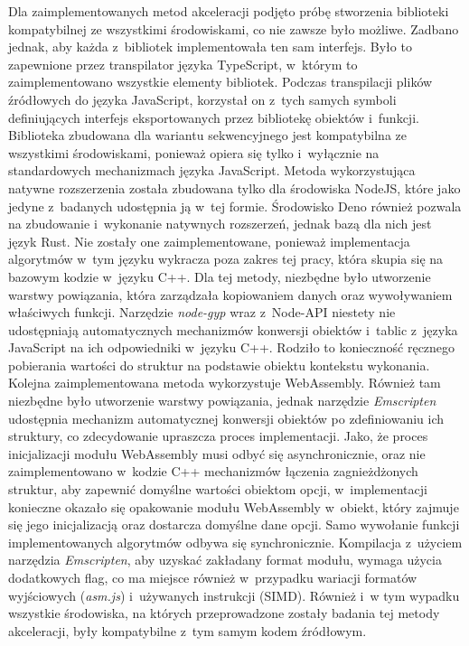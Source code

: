 Dla zaimplementowanych metod akceleracji podjęto próbę stworzenia biblioteki kompatybilnej ze wszystkimi środowiskami, co nie zawsze było możliwe. Zadbano jednak, aby każda z~bibliotek implementowała ten sam interfejs. Było to zapewnione przez transpilator języka TypeScript, w~którym to zaimplementowano wszystkie elementy bibliotek. Podczas transpilacji plików źródłowych do języka JavaScript, korzystał on z~tych samych symboli definiujących interfejs eksportowanych przez bibliotekę obiektów i~funkcji. Biblioteka zbudowana dla wariantu sekwencyjnego jest kompatybilna ze wszystkimi środowiskami, ponieważ opiera się tylko i~wyłącznie na standardowych mechanizmach języka JavaScript. Metoda wykorzystująca natywne rozszerzenia została zbudowana tylko dla środowiska NodeJS, które jako jedyne z~badanych udostępnia ją w~tej formie. Środowisko Deno również pozwala na zbudowanie i~wykonanie natywnych rozszerzeń, jednak bazą dla nich jest język Rust. Nie zostały one zaimplementowane, ponieważ implementacja algorytmów w~tym języku wykracza poza zakres tej pracy, która skupia się na bazowym kodzie w~języku C++. Dla tej metody, niezbędne było utworzenie warstwy powiązania, która zarządzała kopiowaniem danych oraz wywoływaniem właściwych funkcji. Narzędzie \textit{node-gyp} wraz z~Node-API niestety nie udostępniają automatycznych mechanizmów konwersji obiektów i~tablic z~języka JavaScript na ich odpowiedniki w~języku C++. Rodziło to konieczność ręcznego pobierania wartości do struktur na podstawie obiektu kontekstu wykonania. Kolejna zaimplementowana metoda wykorzystuje WebAssembly. Również tam niezbędne było utworzenie warstwy powiązania, jednak narzędzie \textit{Emscripten} udostępnia mechanizm automatycznej konwersji obiektów po zdefiniowaniu ich struktury, co zdecydowanie upraszcza proces implementacji. Jako, że proces inicjalizacji modułu WebAssembly musi odbyć się asynchronicznie, oraz nie zaimplementowano w~kodzie C++ mechanizmów łączenia zagnieżdżonych struktur, aby zapewnić domyślne wartości obiektom opcji, w~implementacji konieczne okazało się opakowanie modułu WebAssembly w~obiekt, który zajmuje się jego inicjalizacją oraz dostarcza domyślne dane opcji. Samo wywołanie funkcji implementowanych algorytmów odbywa się synchronicznie. Kompilacja z~użyciem narzędzia \textit{Emscripten}, aby uzyskać zakładany format modułu, wymaga użycia dodatkowych flag, co ma miejsce również w~przypadku wariacji formatów wyjściowych (\textit{asm.js}) i~używanych instrukcji (SIMD). Również i~w tym wypadku wszystkie środowiska, na których przeprowadzone zostały badania tej metody akceleracji, były kompatybilne z~tym samym kodem źródłowym.

